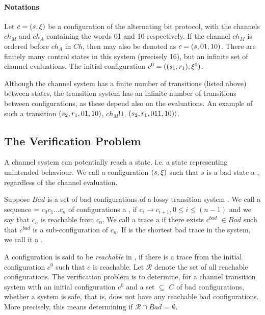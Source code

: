 \paragraph{Notations}
Let $c = (s,\xi)$ be a configuration of the alternating bit protocol, with the channels $ch_M$ and $ch_A$ containing the words 01 and 10 respectively. If the channel $ch_M$ is ordered before $ch_A$ in $Ch$, then  may also be denoted as $c = (s,01,10)$. There are finitely many control states in this system (precisely 16), but an infinite set of channel evaluations. The initial configuration $c^0 = ((s_1, r_1), \xi^0)$.

Although the channel system has a finite number of transitions (listed above) between states, the transition system has an infinite number of transitions between configurations, as these depend also on the evaluations. An example of such a transition $(s_2,r_1,01,10)$, $ch_M!1$, $(s_2,r_1,011,10)\rangle$.

\subsection{The Verification Problem}
\label{badconf}
A channel system can potentially reach a  state, i.e. a state representing unintended behaviour. We call a configuration $(s, \xi)$ such that $s$ is a bad state a , regardless of the channel evaluation.

Suppose $Bad$ is a set of bad configurations of a lossy transition system . We call a sequence  = $c_0c_1\ldots c_n$ of configurations a , if $c_i \rightarrow c_{i+1}, 0 \leq i \leq (n-1)$ and we say that $c_n$ is reachable from $c_0$. We call a trace a  if there exists $c^{bad}$ $\in Bad$ such that $c^{bad}$ is a sub-configuration of $c_n$. If  is the shortest bad trace in the system, we call it a .

A configuration  is said to be \emph{reachable} in , if there is a trace from the initial configuration $c^0$ such that $c$ is reachable. Let $\mathcal{R}$ denote the set of all reachable configurations. The verification problem is to determine, for a channel transition system  with an initial configuration $c^0$ and a set  $\subseteq$ $C$ of bad configurations, whether a system is safe, that is, does not have any reachable bad configurations. More precisely, this means determining if $\mathcal{R} \cap Bad$ = $\emptyset$.

